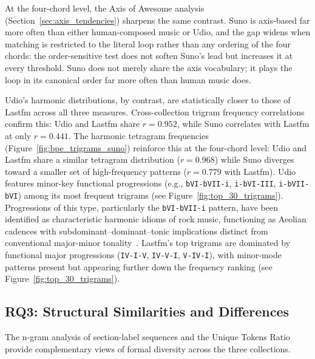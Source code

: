 \documentclass{article}
\newcommand{\rev}[1]{{\color{r2}#1}} %
\begin{document}
\rev{At the four-chord level, the Axis of Awesome analysis (Section~\ref{sec:axis_tendencies}) sharpens the same contrast. Suno is axis-based far more often than either human-composed music or Udio, and the gap widens when matching is restricted to the literal loop rather than any ordering of the four chords: the order-sensitive test does not soften Suno's lead but increases it at every threshold. Suno does not merely share the axis vocabulary; it plays the loop in its canonical order far more often than human music does.}

Udio's harmonic distributions, by contrast, are statistically closer to those of Lastfm across all three measures. Cross-collection trigram frequency correlations confirm this: Udio and Lastfm share $r = 0.952$, while Suno correlates with Lastfm at only $r = 0.441$. The harmonic tetragram frequencies (Figure~\ref{fig:bpe_trigrams_suno}) reinforce this at the four-chord level: Udio and Lastfm share a similar tetragram distribution ($r = 0.968$) while Suno diverges toward a smaller set of high-frequency patterns ($r = 0.779$ with Lastfm). Udio features minor-key functional progressions (e.g., \texttt{bVI-bVII-i}, \texttt{i-bVI-III}, \texttt{i-bVII-bVI}) among its most frequent trigrams (see Figure~\ref{fig:top_30_trigrams}). Progressions of this type, particularly the \texttt{bVI-bVII-i} pattern, have been identified as characteristic harmonic idioms of rock music, functioning as Aeolian cadences with subdominant--dominant--tonic implications distinct from conventional major-minor tonality~\citep{biamonte2010triadic}. Lastfm's top trigrams are dominated by functional major progressions (\texttt{IV-I-V}, \texttt{IV-V-I}, \texttt{V-IV-I}), with minor-mode patterns present but appearing further down the frequency ranking (see Figure~\ref{fig:top_30_trigrams}).

\subsection{RQ3: Structural Similarities and Differences}
\label{sec:disc_structure}

The n-gram analysis of section-label sequences and the Unique Tokens Ratio provide complementary views of formal diversity across the three collections.
\end{document}
